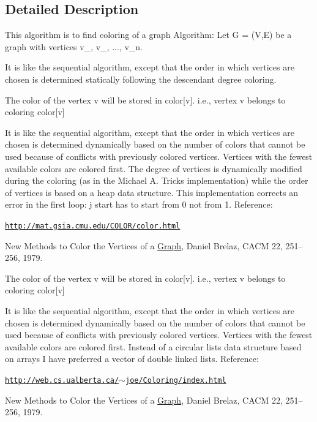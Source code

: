 \subsection{Detailed Description}
This algorithm is to find coloring of a graph Algorithm\+: Let G = (V,E) be a graph with vertices v\+\_, v\+\_, ..., v\+\_\+n. 

It is like the sequential algorithm, except that the order in which vertices are chosen is determined statically following the descendant degree coloring.

The color of the vertex v will be stored in color\mbox{[}v\mbox{]}. i.\+e., vertex v belongs to coloring color\mbox{[}v\mbox{]}

It is like the sequential algorithm, except that the order in which vertices are chosen is determined dynamically based on the number of colors that cannot be used because of conflicts with previously colored vertices. Vertices with the fewest available colors are colored first. The degree of vertices is dynamically modified during the coloring (as in the Michael A. Trick\textquotesingle{}s implementation) while the order of vertices is based on a heap data structure. This implementation corrects an error in the first loop\+: j start has to start from 0 not from 1. Reference\+:
\begin{DoxyItemize}
\item \href{http://mat.gsia.cmu.edu/COLOR/color.html}{\tt http\+://mat.\+gsia.\+cmu.\+edu/\+C\+O\+L\+O\+R/color.\+html}
\item New Methods to Color the Vertices of a \hyperlink{structGraph}{Graph}, Daniel Brelaz, C\+A\+CM 22, 251--256, 1979.
\end{DoxyItemize}

The color of the vertex v will be stored in color\mbox{[}v\mbox{]}. i.\+e., vertex v belongs to coloring color\mbox{[}v\mbox{]}

It is like the sequential algorithm, except that the order in which vertices are chosen is determined dynamically based on the number of colors that cannot be used because of conflicts with previously colored vertices. Vertices with the fewest available colors are colored first. Instead of a circular lists data structure based on arrays I have preferred a vector of double linked lists. Reference\+:
\begin{DoxyItemize}
\item \href{http://web.cs.ualberta.ca/~joe/Coloring/index.html}{\tt http\+://web.\+cs.\+ualberta.\+ca/$\sim$joe/\+Coloring/index.\+html}
\item New Methods to Color the Vertices of a \hyperlink{structGraph}{Graph}, Daniel Brelaz, C\+A\+CM 22, 251--256, 1979.
\end{DoxyItemize}

